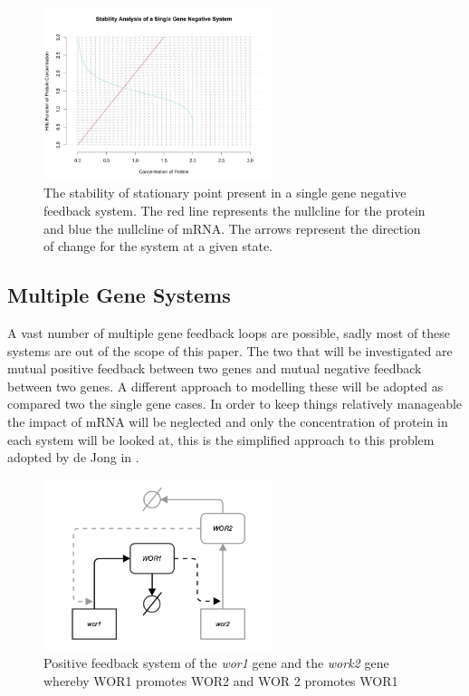 \documentclass[]{article}
\begin{document}
            \begin{figure}[h!]
            \centering
            \includegraphics[width=0.6\textwidth]{./figures/stabilitySingleNegative.jpeg}
            \caption{The stability of stationary point present in a single gene negative feedback system. The red line represents the nullcline for the protein and blue the nullcline of mRNA. The arrows represent the direction of change for the system at a given state.}
            \label{stabilitySingleNegative}
            \end{figure}
            
\pagebreak
        \subsection{Multiple Gene Systems}
        A vast number of multiple gene feedback loops are possible, sadly most of these systems are out of the scope of this paper. %
        The two that will be investigated are mutual positive feedback between two genes and mutual negative feedback between two genes. A different approach to modelling these will be adopted as compared two the single gene cases. In order to keep things relatively manageable the impact of mRNA will be neglected and only the concentration of protein in each system will be looked at, this is the simplified approach to this problem adopted by de Jong in \cite{multiGene}. 

        \begin{figure}[h!]
        \centering
        \includegraphics[width=0.6\textwidth]{./figures/doublePositive.png}
        \caption{Positive feedback system of the \textit{wor1} gene and the \textit{work2} gene whereby WOR1 promotes WOR2 and WOR 2 promotes WOR1}
        \label{doublePositive}
        \end{figure}            
    
\end{document}

